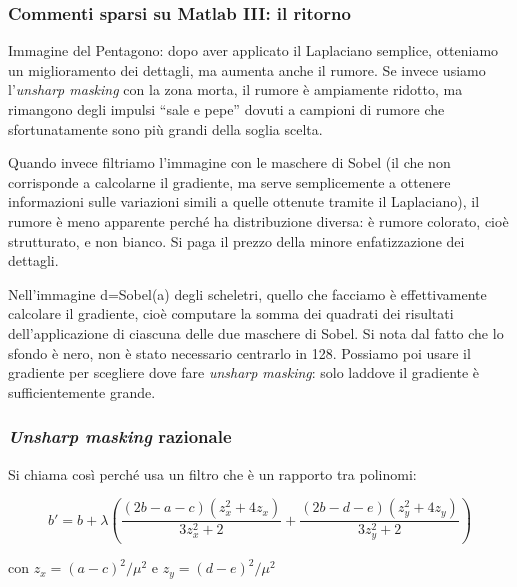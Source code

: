 \documentclass[a4paper,11pt]{article}
\begin{document}
\subsubsection{Commenti sparsi su Matlab III: il ritorno}
Immagine del Pentagono: dopo aver applicato il Laplaciano semplice, otteniamo un miglioramento dei dettagli, ma aumenta anche il rumore.
Se invece usiamo l'\textit{unsharp masking} con la zona morta, il rumore è ampiamente ridotto, ma rimangono degli impulsi ``sale e pepe''
dovuti a campioni di rumore che sfortunatamente sono più grandi della soglia scelta.
\par
Quando invece filtriamo l'immagine con le maschere di Sobel (il che non corrisponde a calcolarne il gradiente, ma serve semplicemente a ottenere
informazioni sulle variazioni simili a quelle ottenute tramite il Laplaciano), il rumore è meno apparente perché ha distribuzione diversa:
è rumore colorato, cioè strutturato, e non bianco. Si paga il prezzo della minore enfatizzazione dei dettagli.
\par
Nell'immagine d=Sobel(a) degli scheletri, quello che facciamo è effettivamente calcolare il gradiente, cioè computare la somma dei quadrati
dei risultati dell'applicazione di ciascuna delle due maschere di Sobel. Si nota dal fatto che lo sfondo è nero, non è stato necessario
centrarlo in 128. Possiamo poi usare il gradiente per scegliere dove fare \textit{unsharp masking}: solo laddove il gradiente è sufficientemente
grande.

\subsubsection{\textit{Unsharp masking} razionale}
Si chiama così perché usa un filtro che è un rapporto tra polinomi:

\[
b' = b + \lambda \left(
\frac{(2b-a-c)(z_x^2 +4z_x)}{3z_x^2+2} +
\frac{(2b-d-e)(z_y^2 +4z_y)}{3z_y^2+2}
\right)
\]

con $z_x = (a-c)^2 / \mu^2$ e $z_y = (d - e)^2 / \mu^2$
\end{document}
